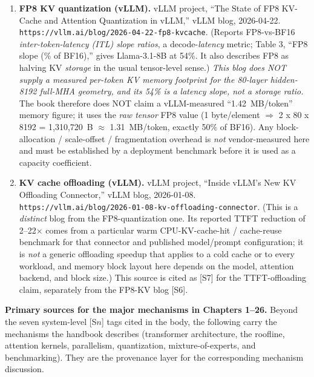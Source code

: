 \begin{enumerate}
\item \textbf{FP8 KV quantization (vLLM).} vLLM project, ``The State of FP8 KV-Cache and Attention Quantization in vLLM,'' vLLM blog, 2026-04-22. \texttt{https://vllm.ai/blog/2026-04-22-fp8-kvcache}. (Reports FP8-vs-BF16 \emph{inter-token-latency (ITL) slope ratios}, a decode-\emph{latency} metric; Table 3, ``FP8 slope (\% of BF16),'' gives Llama-3.1-8B at 54\%. It also describes FP8 as halving KV \emph{storage} in the usual tensor-level sense.) \emph{This blog does NOT supply a measured per-token KV \emph{memory} footprint for the 80-layer hidden-8192 full-MHA geometry, and its 54\% is a latency slope, not a storage ratio.} The book therefore does NOT claim a vLLM-measured ``1.42~MB/token'' memory figure; it uses the \emph{raw tensor} FP8 value (1 byte/element $\Rightarrow$ 2 x 80 x 8192 = 1,310,720~B $\approx$ 1.31~MB/token, exactly 50\% of BF16). Any block-allocation / scale-offset / fragmentation overhead is \emph{not} vendor-measured here and must be established by a deployment benchmark before it is used as a capacity coefficient.
\item \textbf{KV cache offloading (vLLM).} vLLM project, ``Inside vLLM's New KV Offloading Connector,'' vLLM blog, 2026-01-08. \texttt{https://vllm.ai/blog/2026-01-08-kv-offloading-connector}. (This is a \emph{distinct} blog from the FP8-quantization one. Its reported TTFT reduction of 2--22$\times$ comes from a particular warm CPU-KV-cache-hit / cache-reuse benchmark for that connector and published model/prompt configuration; it is \emph{not} a generic offloading speedup that applies to a cold cache or to every workload, and memory block layout here depends on the model, attention backend, and block size.) This source is cited as \textsc{[S7]} for the TTFT-offloading claim, separately from the FP8-KV blog \textsc{[S6]}.
\end{enumerate}

\medskip
\noindent\textbf{Primary sources for the major mechanisms in Chapters 1--26.} Beyond the seven system-level \textsc{[S$n$]} tags cited in the body, the following carry the mechanisms the handbook describes (transformer architecture, the roofline, attention kernels, parallelism, quantization, mixture-of-experts, and benchmarking). They are the provenance layer for the corresponding mechanism discussion.


